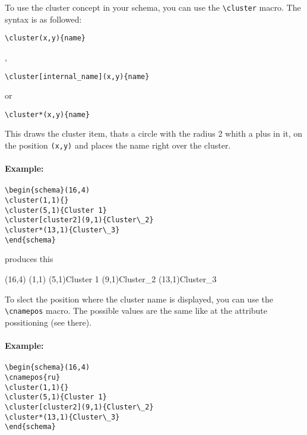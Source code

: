 \documentclass[a4paper,11pt]{article}
\begin{document}
To use the cluster concept in your schema, you can use the \verb|\cluster| macro.
The syntax is as followed:

\begin{verbatim}
\cluster(x,y){name}
\end{verbatim}

,

\begin{verbatim}
\cluster[internal_name](x,y){name}
\end{verbatim}

or

\begin{verbatim}
\cluster*(x,y){name}
\end{verbatim}

This draws the cluster item, thats a circle with the radius 2 whith a 
plus in it, on the position {\tt (x,y)} and places the name right over 
the cluster.

\paragraph{Example:}

\begin{verbatim}
\begin{schema}(16,4)
\cluster(1,1){}
\cluster(5,1){Cluster 1}
\cluster[cluster2](9,1){Cluster\_2}
\cluster*(13,1){Cluster\_3}
\end{schema}
\end{verbatim}

produces this

\begin{schema}(16,4)
\cluster(1,1){}
\cluster(5,1){Cluster 1}
\cluster[cluster2](9,1){Cluster\_2}
\cluster*(13,1){Cluster\_3}
\end{schema}

To slect the position where the cluster name is displayed, you can use the 
\verb|\cnamepos| macro. The possible values are the same like at the attribute 
possitioning (see there).

\paragraph{Example:}

\begin{verbatim}
\begin{schema}(16,4)
\cnamepos{ru}
\cluster(1,1){}
\cluster(5,1){Cluster 1}
\cluster[cluster2](9,1){Cluster\_2}
\cluster*(13,1){Cluster\_3}
\end{schema}
\end{verbatim}
\end{document}
